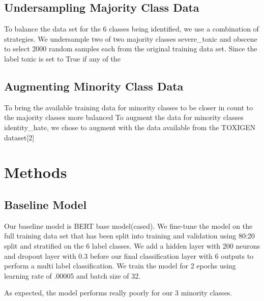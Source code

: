 \documentclass[11pt,a4paper]{article}
\begin{document}
\subsection{Undersampling Majority Class Data}
To balance the data set for the 6 classes being identified, we use a combination of strategies. We undersample two of two majority classes severe\_toxic and obscene to select 2000 random samples each from the original training data set. Since the label toxic is set to True if any of the 

\subsection{Augmenting Minority Class Data}
To bring the available training data for minority classes to be closer in count to the majority classes more balanced To augment the data for minority classes identity\_hate, we chose to augment with the data available from the TOXIGEN dataset[2]


\section{Methods}

\subsection{Baseline Model}
Our baseline model is BERT base model(cased). We fine-tune the model on the full training data set that has been split into training and validation using 80:20 split and stratified on the 6 label classes. We add a hidden layer with 200 neurons and dropout layer with 0.3 before our final classification layer with 6 outputs to perform a multi label classification. We train the model for 2 epochs using learning rate of .00005 and batch size of 32.

As expected, the model performs really poorly for our 3 minority classes.
\end{document}
